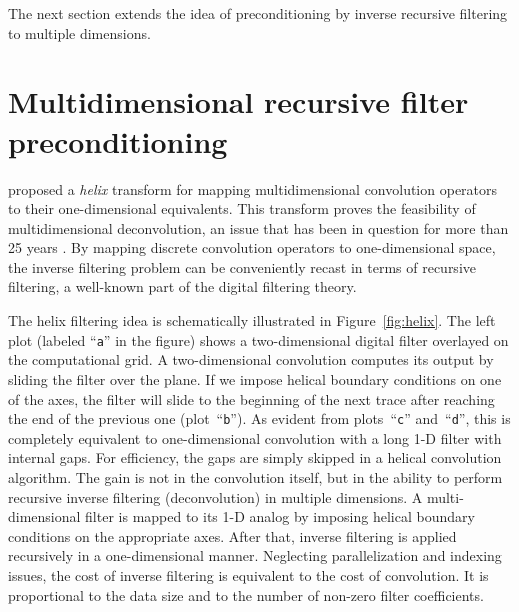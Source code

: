 The next section extends the idea of preconditioning by inverse
recursive filtering to multiple dimensions.

\section{Multidimensional recursive filter preconditioning}


\cite{helix} proposed a \emph{helix} transform for mapping
multidimensional convolution operators to their one-dimensional
equivalents.  This transform proves the feasibility of
multidimensional deconvolution, an issue that has been in question for
more than 25 years \cite[]{Claerbout.blackwell.76}.  By mapping discrete
convolution operators to one-dimensional space, the inverse filtering
problem can be conveniently recast in terms of recursive filtering, a
well-known part of the digital filtering theory.


The helix filtering idea is schematically illustrated in
Figure~\ref{fig:helix}. The left plot (labeled ``\texttt{a}'' in the
figure) shows a two-dimensional digital filter overlayed on the
computational grid. A two-dimensional convolution computes its output
by sliding the filter over the plane. If we impose helical boundary
conditions on one of the axes, the filter will slide to the beginning
of the next trace after reaching the end of the previous one
(plot~``\texttt{b}''). As evident from plots~``\texttt{c}''
and~``\texttt{d}'', this is completely equivalent to one-dimensional
convolution with a long 1-D filter with internal gaps.  For
efficiency, the gaps are simply skipped in a helical convolution
algorithm. The gain is not in the convolution
itself, but in the ability to perform recursive inverse filtering
(deconvolution) in multiple dimensions. A multi-dimensional filter is
mapped to its 1-D analog by imposing helical boundary conditions on
the appropriate axes. After that, inverse filtering is applied
recursively in a one-dimensional manner.  Neglecting parallelization
and indexing issues, the cost of inverse filtering is equivalent to
the cost of convolution. It is proportional to the data size and to
the number of non-zero filter coefficients.

